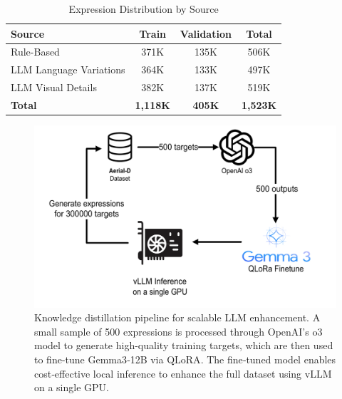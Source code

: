 \begin{table}[t]
\centering
\caption{Expression Distribution by Source}
\label{tab:llm_enhancement_stats}
\footnotesize
\begin{tabular}{@{}lccc@{}}
\toprule
\textbf{Source} & \textbf{Train} & \textbf{Validation} & \textbf{Total} \\
\midrule
Rule-Based & 371K & 135K & 506K \\
LLM Language Variations & 364K & 133K & 497K \\
LLM Visual Details & 382K & 137K & 519K \\
\midrule
\textbf{Total} & \textbf{1,118K} & \textbf{405K} & \textbf{1,523K} \\
\bottomrule
\end{tabular}
\end{table}

\begin{figure}[!b]
\centering
\includegraphics[width=\columnwidth]{./images/distillation.png}
\caption{Knowledge distillation pipeline for scalable LLM enhancement. A small sample of 500 expressions is processed through OpenAI's o3 model\cite{o3} to generate high-quality training targets, which are then used to fine-tune Gemma3‑12B\cite{gemma3} via QLoRA\cite{qlora}. The fine‑tuned model enables cost‑effective local inference to enhance the full dataset using vLLM\cite{vllm} on a single GPU.}
\label{fig:llm_distillation}
\end{figure}
